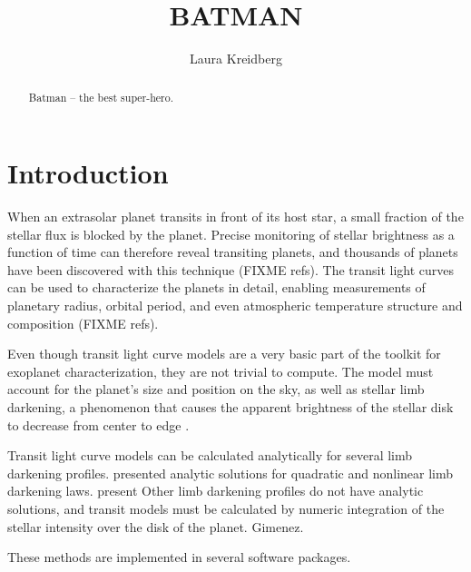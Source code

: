\documentclass[12pt,preprint]{aastex}
\begin{document}
\title{BATMAN}

\author{Laura Kreidberg}



\begin{abstract}
Batman -- the best super-hero.
\end{abstract}



\section{Introduction}
When an extrasolar planet transits in front of its host star, a small fraction of the stellar flux is blocked by the planet.  Precise monitoring of stellar brightness as a function of time can therefore reveal transiting planets, and thousands of planets have been discovered with this technique (FIXME refs).  The transit light curves can be used to characterize the planets in detail, enabling measurements of planetary radius, orbital period, and even atmospheric temperature structure and composition (FIXME refs).  %

Even though transit light curve models are a very basic part of the toolkit for exoplanet characterization, they are not trivial to compute.  The model must account for the planet's size and position on the sky, as well as stellar limb darkening, a phenomenon that causes the apparent brightness of the stellar disk to decrease from center to edge \citep{milne21}.  

Transit light curve models can be calculated analytically for several limb darkening profiles.  \citep{mandel02} presented analytic solutions for quadratic and nonlinear limb darkening laws.  \citep{gimenez06} present Other limb darkening profiles do not have analytic solutions, and transit models must be calculated by numeric integration of the stellar intensity over the disk of the planet. Gimenez.


These methods are implemented in several software packages.
\end{document}
